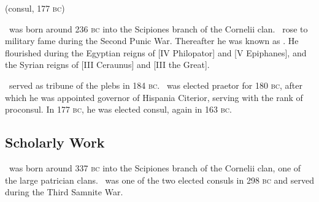 \documentclass[oneside]{article}
\begin{document}
  { (consul, 177 \textsc{bc})}


\renewcommand*\NamesFormat[1]
{%
  \ifNoPraenomen\XPraetrue\fi%
  \ifNoGens\XGenstrue\fi%
  \ifNoCognomen\XCogntrue\fi%
  \ifNoAgnomen\XAgnotrue\fi%
  #1\NameQueryInfo{}%
  \global\NoPraenomenfalse%
  \global\NoGensfalse%
  \global\NoCognomenfalse%
  \global\NoAgnomenfalse%
}

\renewcommand*\MainNameHook[1]
{%
  \ifNoPraenomen\XPraetrue\fi%
  \ifNoGens\XGenstrue\fi%
  \ifNoCognomen\XCogntrue\fi%
  \ifNoAgnomen\XAgnotrue\fi%
  #1%
  \global\NoPraenomenfalse%
  \global\NoGensfalse%
  \global\NoCognomenfalse%
  \global\NoAgnomenfalse%
}

\NoAgnomentrue\Scipio\ was born around 236 \textsc{bc}
into the Scipiones branch of the Cornelii clan.
\NoAgnomentrue\Scipio\ rose to military fame during the
Second Punic War. Thereafter he was known as \Scipio.
He flourished during the Egyptian reigns of
[IV Philopator] and
[V Epiphanes], and the Syrian
reigns of [III Ceraunus] and
[III the Great].

\TGrac\ served as tribune of the plebs in 184 \textsc{bc}.
\TGrac\ was elected praetor for 180 \textsc{bc},
after which he was appointed governor of Hispania Citerior,
serving with the rank of proconsul. In 177 \textsc{bc},
he was elected consul, again in 163 \textsc{bc}.

\subsection{Scholarly Work}


\newcommand*\CSB
{%
  \ifXGens
    \ifXAgno Scipio\else
      Scipio Barbatus\fi
  \else
    \ifXCogn Cornelius\else
      \ifXAgno Cornelius Scipio\else
        Cornelius Scipio Barbatus%
      \fi
    \fi
  \fi
}

\OScipio\ was born around 337 \textsc{bc} into the
Scipiones branch of the Cornelii clan, one of the large
patrician clans. \NoGenstrue\NoAgnomentrue\OScipio\ was
one of the two elected consuls in 298 \textsc{bc}
and served during the Third Samnite War.
\end{document}
